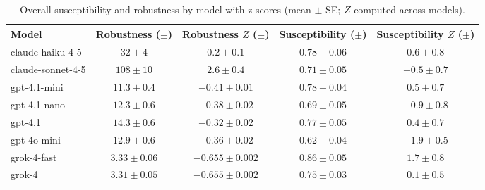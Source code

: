 \begin{table*}[!t]
  \centering
  \caption{Overall susceptibility and robustness by model with z-scores (mean $\pm$ SE; $Z$ computed across models).}
  \label{tab:summary_by_model_with_z}
  \begin{tabular}{lcccc}
    \toprule
    Model & Robustness ($\pm$) & Robustness $Z$ ($\pm$) & Susceptibility ($\pm$) & Susceptibility $Z$ ($\pm$) \\
    \midrule
    claude-haiku-4-5 & $32\pm 4$ & $0.2\pm 0.1$ & $0.78\pm 0.06$ & $0.6\pm 0.8$ \\
    claude-sonnet-4-5 & $108\pm 10$ & $2.6\pm 0.4$ & $0.71\pm 0.05$ & $-0.5\pm 0.7$ \\
    gpt-4.1-mini & $11.3\pm 0.4$ & $-0.41\pm 0.01$ & $0.78\pm 0.04$ & $0.5\pm 0.7$ \\
    gpt-4.1-nano & $12.3\pm 0.6$ & $-0.38\pm 0.02$ & $0.69\pm 0.05$ & $-0.9\pm 0.8$ \\
    gpt-4.1 & $14.3\pm 0.6$ & $-0.32\pm 0.02$ & $0.77\pm 0.05$ & $0.4\pm 0.7$ \\
    gpt-4o-mini & $12.9\pm 0.6$ & $-0.36\pm 0.02$ & $0.62\pm 0.04$ & $-1.9\pm 0.5$ \\
    grok-4-fast & $3.33\pm 0.06$ & $-0.655\pm 0.002$ & $0.86\pm 0.05$ & $1.7\pm 0.8$ \\
    grok-4 & $3.31\pm 0.05$ & $-0.655\pm 0.002$ & $0.75\pm 0.03$ & $0.1\pm 0.5$ \\
    \bottomrule
  \end{tabular}
\end{table*}
